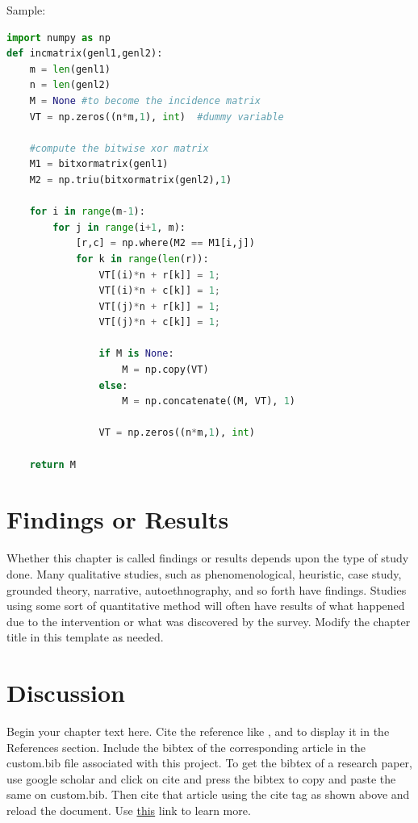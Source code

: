 \documentclass[12pt]{report}
\begin{document}
Sample:
\begin{singlespace}
\begin{lstlisting}[language=Python]
import numpy as np
def incmatrix(genl1,genl2):
    m = len(genl1)
    n = len(genl2)
    M = None #to become the incidence matrix
    VT = np.zeros((n*m,1), int)  #dummy variable
    
    #compute the bitwise xor matrix
    M1 = bitxormatrix(genl1)
    M2 = np.triu(bitxormatrix(genl2),1) 

    for i in range(m-1):
        for j in range(i+1, m):
            [r,c] = np.where(M2 == M1[i,j])
            for k in range(len(r)):
                VT[(i)*n + r[k]] = 1;
                VT[(i)*n + c[k]] = 1;
                VT[(j)*n + r[k]] = 1;
                VT[(j)*n + c[k]] = 1;
                
                if M is None:
                    M = np.copy(VT)
                else:
                    M = np.concatenate((M, VT), 1)
                
                VT = np.zeros((n*m,1), int)
    
    return M
\end{lstlisting}
\end{singlespace}

\chapter{Findings or Results}
Whether this chapter is called findings or results depends upon the type of study done. Many qualitative studies, such as phenomenological, heuristic, case study, grounded theory, narrative, autoethnography, and so forth have findings. Studies using some sort of quantitative method will often have results of what happened due to the intervention or what was discovered by the survey. Modify the chapter title in this template as needed. 

\chapter{Discussion}
Begin your chapter text here. Cite the reference like \cite{arslan2013psychological}, \cite{turing1936computable} and \cite{knuth1984texbook} to display it in the References section. Include the bibtex of the corresponding article in the custom.bib file associated with this project. To get the bibtex of a research paper, use google scholar and click on cite and press the bibtex to copy and paste the same on custom.bib. Then cite that article using the cite tag as shown above and reload the document. Use \href{https://www.overleaf.com/learn/latex/Bibliography_management_in_LaTeX#The_bibliography_file}{this} link to learn more.
\end{document}

